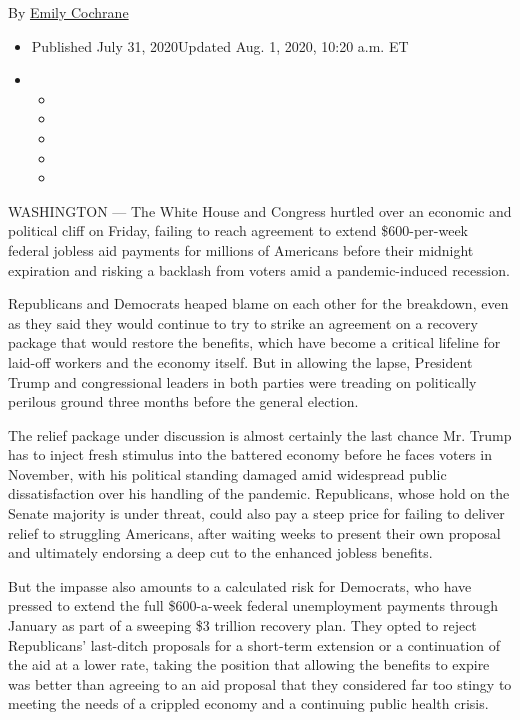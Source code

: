 By \href{https://www.nytimes3xbfgragh.onion/by/emily-cochrane}{Emily
Cochrane}

\begin{itemize}
\item
  Published July 31, 2020Updated Aug. 1, 2020, 10:20 a.m. ET
\item
  \begin{itemize}
  \item
  \item
  \item
  \item
  \item
  \end{itemize}
\end{itemize}

WASHINGTON --- The White House and Congress hurtled over an economic and
political cliff on Friday, failing to reach agreement to extend
\$600-per-week federal jobless aid payments for millions of Americans
before their midnight expiration and risking a backlash from voters amid
a pandemic-induced recession.

Republicans and Democrats heaped blame on each other for the breakdown,
even as they said they would continue to try to strike an agreement on a
recovery package that would restore the benefits, which have become a
critical lifeline for laid-off workers and the economy itself. But in
allowing the lapse, President Trump and congressional leaders in both
parties were treading on politically perilous ground three months before
the general election.

The relief package under discussion is almost certainly the last chance
Mr. Trump has to inject fresh stimulus into the battered economy before
he faces voters in November, with his political standing damaged amid
widespread public dissatisfaction over his handling of the pandemic.
Republicans, whose hold on the Senate majority is under threat, could
also pay a steep price for failing to deliver relief to struggling
Americans, after waiting weeks to present their own proposal and
ultimately endorsing a deep cut to the enhanced jobless benefits.

But the impasse also amounts to a calculated risk for Democrats, who
have pressed to extend the full \$600-a-week federal unemployment
payments through January as part of a sweeping \$3 trillion recovery
plan. They opted to reject Republicans' last-ditch proposals for a
short-term extension or a continuation of the aid at a lower rate,
taking the position that allowing the benefits to expire was better than
agreeing to an aid proposal that they considered far too stingy to
meeting the needs of a crippled economy and a continuing public health
crisis.


